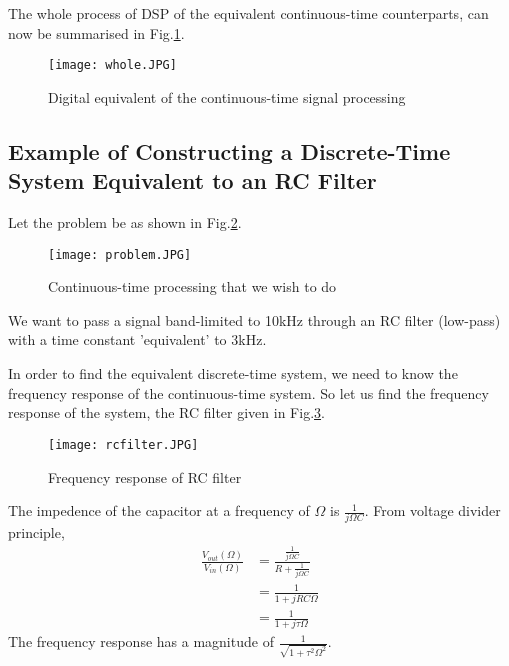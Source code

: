 The whole process of DSP of the equivalent continuous-time counterparts, can now be summarised in Fig.\ref{whole}. 
\begin{figure}[h] 
        \centering
        
                \texttt{[image: whole.JPG]}
                \caption{Digital equivalent of the continuous-time signal processing}
                \label{whole}
        
\end{figure}

\subsection{Example of Constructing a Discrete-Time System Equivalent to an RC Filter}
Let the problem be as shown in Fig.\ref{problem}. 
\begin{figure}[h]
        \centering
        
                \texttt{[image: problem.JPG]}
                \caption{Continuous-time processing that we wish to do}
                \label{problem}
        
\end{figure}
We want to pass a signal band-limited to 10kHz through an RC filter (low-pass) with a time constant 'equivalent' to 3kHz.

In order to find the equivalent discrete-time system, we need to know the frequency response of the continuous-time system. So let us find the frequency response of the system, the RC filter given in Fig.\ref{rcfilter}.  
\begin{figure}[h] 
        \centering
        
                \texttt{[image: rcfilter.JPG]}
                \caption{Frequency response of RC filter}
                \label{rcfilter}
        
\end{figure}
The impedence of the capacitor at a frequency of $\Omega$ is $\frac{1}{j\Omega C}$. From voltage divider principle,
\begin{equation}
\begin{split}
\frac{V_{out}(\Omega)}{V_{in}(\Omega)} & = \frac{\frac{1}{j\Omega C}}{R + \frac{1}{j\Omega C}}\\
									   & = \frac{1}{1 + jRC\Omega}\\
                                       & = \frac{1}{1 + j\tau\Omega}
\end{split}
\end{equation}
The frequency response has a magnitude of $\frac{1}{\sqrt{{1 + \tau^{2}\Omega^{2}}}}$. 

